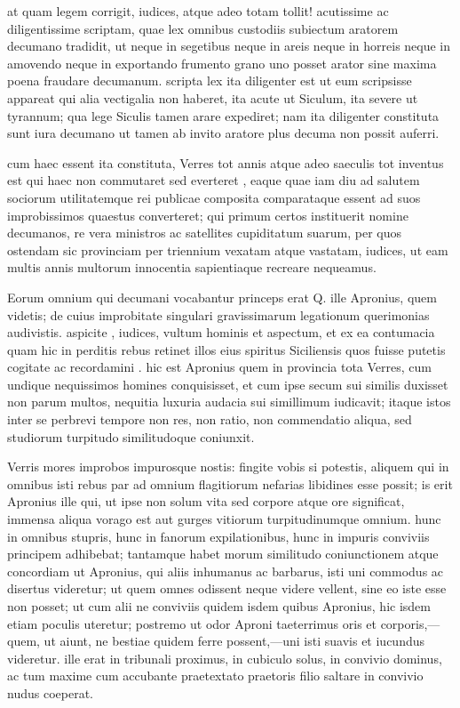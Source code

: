  at quam legem corrigit, iudices, atque adeo totam tollit! acutissime ac diligentissime scriptam, quae lex omnibus custodiis subiectum aratorem decumano tradidit, ut neque in segetibus neque in areis neque in horreis neque in amovendo neque in exportando frumento grano uno posset arator sine maxima poena fraudare decumanum. scripta lex ita diligenter est ut eum scripsisse appareat qui alia vectigalia non haberet, ita acute ut Siculum, ita severe ut tyrannum; qua lege Siculis tamen arare expediret; nam ita diligenter constituta sunt iura decumano ut tamen ab invito aratore plus decuma non possit auferri.

 cum haec essent ita constituta, Verres tot annis atque adeo saeculis tot inventus est qui haec non commutaret sed everteret , eaque quae iam diu ad salutem sociorum utilitatemque rei publicae composita comparataque essent ad suos improbissimos quaestus converteret; qui primum certos instituerit nomine decumanos, re vera ministros ac satellites cupiditatum suarum, per quos ostendam sic provinciam per triennium vexatam atque vastatam, iudices, ut eam multis annis multorum innocentia sapientiaque recreare nequeamus.

 Eorum omnium qui decumani vocabantur princeps erat Q. ille Apronius, quem videtis; de cuius improbitate singulari gravissimarum legationum querimonias audivistis. aspicite , iudices, vultum hominis et aspectum, et ex ea contumacia quam hic in perditis rebus retinet illos eius spiritus Siciliensis quos fuisse putetis cogitate ac recordamini . hic est Apronius quem in provincia tota Verres, cum undique nequissimos homines conquisisset, et cum ipse secum sui similis duxisset non parum multos, nequitia luxuria audacia sui simillimum iudicavit; itaque istos inter se perbrevi tempore non res, non ratio, non commendatio aliqua, sed studiorum turpitudo similitudoque coniunxit.

 Verris mores improbos impurosque nostis: fingite vobis si potestis, aliquem qui in omnibus isti rebus par ad omnium flagitiorum nefarias libidines esse possit; is erit Apronius ille qui, ut ipse non solum vita sed corpore atque ore significat, immensa aliqua vorago est aut gurges vitiorum turpitudinumque omnium. hunc in omnibus stupris, hunc in fanorum expilationibus, hunc in impuris conviviis principem adhibebat; tantamque habet morum similitudo coniunctionem atque concordiam ut Apronius, qui aliis inhumanus ac barbarus, isti uni commodus ac disertus videretur; ut quem omnes odissent neque videre vellent, sine eo iste esse non posset; ut cum alii ne conviviis quidem isdem quibus Apronius, hic isdem etiam poculis uteretur; postremo ut odor Aproni taeterrimus oris et corporis,—quem, ut aiunt, ne bestiae quidem ferre possent,—uni isti suavis et iucundus videretur. ille erat in tribunali proximus, in cubiculo solus, in convivio dominus, ac tum maxime cum accubante praetextato praetoris filio saltare in convivio nudus coeperat.

